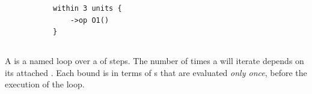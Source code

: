 \begin{figure}[H]
\begin{subfigure}[t]{\egtextwidth}
\begin{lstlisting}[style=Example]
within 3 units {
    ->op O1()
}
\end{lstlisting}
\end{subfigure}
\hfill
\begin{subfigure}[t]{\eggraphicalwidth}
  \gsecaption
  \centering
\end{subfigure}
\end{figure}

\subsection{\mloopstep}\label{ssec:metamodel-steps-loops}

\newcommand{\egloopmatrix}{
  \node[rcmodule](mstart) {\egtarget}; \pgfmatrixnextcell \node[world](wstart) {\egworld}; \\
  \coordinate(mls); \pgfmatrixnextcell \coordinate(wls); \\
  \coordinate(mo); \pgfmatrixnextcell \coordinate(wo); \\
  \coordinate(mle); \pgfmatrixnextcell \coordinate(wle); \\
}
\newcommand{\egloopdiagram}[2]{
  \matrix[diagram]{\egloopmatrix};
  \draw[lifeline] (mstart) -- (mls) -- (mo) -- (mle);
  \draw[lifeline] (wstart) -- (wls) -- (wo) -- (wle);
  \draw (mo) edge[oarrow, "O1()"] (wo);
  \gloop{mls}{wls}{mle}{wle}{#1}{#2}
}

A \mloopstep{} is a named loop over a \msubsequence{} of steps.
The number of times a \mloopstep{} will iterate 
depends on its attached \mloopbound{}.  Each bound is in terms of
\mexpression{}s that are evaluated \emph{only once}, before the execution
of the loop.

